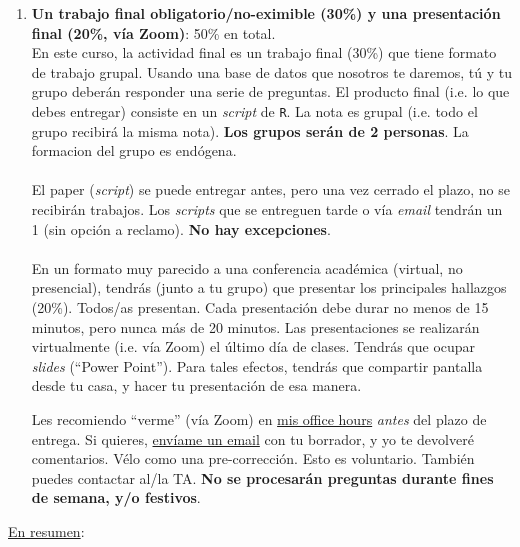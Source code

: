 \documentclass[letterpaper]{article}
\begin{document}
\begin{enumerate}
\item {\bf Un trabajo final obligatorio/no-eximible (30\%) y una presentaci\'on final (20\%, v\'ia Zoom)}: 50\% en total.\\


En este curso, la actividad final es un trabajo final (30\%) que tiene formato de trabajo grupal. Usando una base de datos que nosotros te daremos, t\'u y tu grupo deber\'an responder una serie de preguntas. El producto final (i.e. lo que debes entregar) consiste en un \emph{script} de \texttt{R}. La nota es grupal (i.e. todo el grupo recibir\'a la misma nota). {\bf Los grupos ser\'an de 2 personas}. La formacion del grupo es end\'ogena.
\\
\\
El paper (\emph{script}) se puede entregar antes, pero una vez cerrado el plazo, no se recibir\'an trabajos. Los \emph{scripts} que se entreguen tarde o v\'ia \emph{email} tendr\'an un 1 (sin opci\'on a reclamo). {\bf No hay excepciones}. 
\\
\\
En un formato muy parecido a una conferencia acad\'emica (virtual, no presencial), tendr\'as (junto a tu grupo) que presentar los principales hallazgos (20\%). Todos/as presentan. Cada presentaci\'on debe durar no menos de 15 minutos, pero nunca m\'as de 20 minutos. Las presentaciones se realizar\'an virtualmente (i.e. v\'ia Zoom) el \'ultimo d\'ia de clases. Tendr\'as que ocupar \emph{slides} (``Power Point''). Para tales efectos, tendr\'as que compartir pantalla desde tu casa, y hacer tu presentaci\'on de esa manera.



Les recomiendo ``verme'' (v\'ia Zoom) en \href{https://calendly.com/bahamonde/officehours}{mis office hours} \emph{antes} del plazo de entrega. Si quieres, \href{mailto:\filetext}{env\'iame un email} con tu borrador, y yo te devolver\'e comentarios. V\'elo como una pre-correcci\'on. Esto es voluntario. Tambi\'en puedes contactar al/la TA. {\bf No se procesar\'an preguntas durante fines de semana, y/o festivos}.


\end{enumerate}


\underline{En resumen}:
\end{document}
